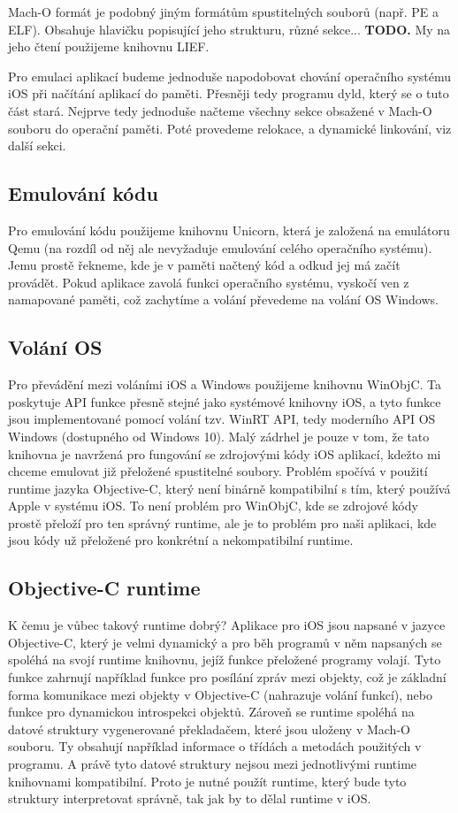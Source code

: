 \documentclass[12pt]{article}
\begin{document}
Mach-O formát je podobný jiným formátům spustitelných souborů (např. PE a ELF).
Obsahuje hlavičku popisující jeho strukturu, různé sekce... \textbf{TODO.}
My na jeho čtení použijeme knihovnu LIEF.

Pro emulaci aplikací budeme jednoduše napodobovat chování operačního systému iOS při načítání aplikací do paměti.
Přesněji tedy programu dyld, který se o tuto část stará.
Nejprve tedy jednoduše načteme všechny sekce obsažené v Mach-O souboru do operační paměti.
Poté provedeme relokace, a dynamické linkování, viz další sekci.

\subsection*{Emulování kódu}

Pro emulování kódu použijeme knihovnu Unicorn, která je založená na emulátoru Qemu (na rozdíl od něj ale nevyžaduje emulování celého operačního systému).
Jemu prostě řekneme, kde je v paměti načtený kód a odkud jej má začít provádět.
Pokud aplikace zavolá funkci operačního systému, vyskočí ven z namapované paměti, což zachytíme a volání převedeme na volání OS Windows.

\subsection*{Volání OS}

Pro převádění mezi voláními iOS a Windows použijeme knihovnu WinObjC.
Ta poskytuje API funkce přesně stejné jako systémové knihovny iOS, a tyto funkce jsou implementované pomocí volání tzv. WinRT API, tedy moderního API OS Windows (dostupného od Windows 10).
Malý zádrhel je pouze v tom, že tato knihovna je navržená pro fungování se zdrojovými kódy iOS aplikací, kdežto mi chceme emulovat již přeložené spustitelné soubory.
Problém spočívá v použití runtime jazyka Objective-C, který není binárně kompatibilní s tím, který používá Apple v systému iOS.
To není problém pro WinObjC, kde se zdrojové kódy prostě přeloží pro ten správný runtime, ale je to problém pro naši aplikaci, kde jsou kódy už přeložené pro konkrétní a nekompatibilní runtime.

\subsection*{Objective-C runtime}

K čemu je vůbec takový runtime dobrý?
Aplikace pro iOS jsou napsané v jazyce Objective-C, který je velmi dynamický a pro běh programů v něm napsaných se spoléhá na svojí runtime knihovnu, jejíž funkce přeložené programy volají.
Tyto funkce zahrnují například funkce pro posílání zpráv mezi objekty, což je základní forma komunikace mezi objekty v Objective-C (nahrazuje volání funkcí), nebo funkce pro dynamickou introspekci objektů.
Zároveň se runtime spoléhá na datové struktury vygenerované překladačem, které jsou uloženy v Mach-O souboru.
Ty obsahují například informace o třídách a metodách použitých v programu.
A právě tyto datové struktury nejsou mezi jednotlivými runtime knihovnami kompatibilní.
Proto je nutné použít runtime, který bude tyto struktury interpretovat správně, tak jak by to dělal runtime v iOS.
\end{document}
